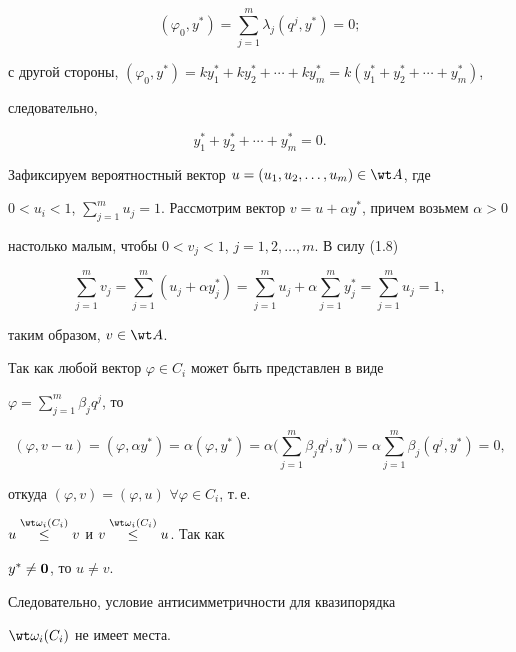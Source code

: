 $$ 


(\varphi_0,y^*)=\sum^m_{j=1}\lambda_j(q^j,y^*)=0; 


$$ 


с другой стороны, $(\varphi_0,y^*)=k y^*_1+k y^*_2+\dotsb+k 


y^*_m=k(y^*_1+y^*_2+\dotsb+y^*_m)$,


следовательно, 


\begin{equation} 


y^*_1+y^*_2+\dotsb+y^*_m=0. 


\end{equation} 


 


Зафиксируем вероятностный вектор $u=(u_1,u_2,\dotsc,u_m)\in\wt A$, где 


$0<u_i<1$, $\sum\limits^m_{j=1}u_j=1$. Рассмотрим вектор $v=u+\alpha 


y^*$, причем возьмем $\alpha>0$ 


настолько малым, чтобы $0<v_j<1$, $j=1,2,\dotsc,m$. В силу (1.8) 


$$ 


\sum^m_{j=1}v_j=\sum^m_{j=1}(u_j+\alpha y^*_j)= 


\sum^m_{j=1}u_j+\alpha\sum^m_{j=1}y^*_j=\sum^m_{j=1}u_j=1, 


$$ 


таким образом, $v\in\wt A$. 


 


Так как любой вектор $\varphi\in C_i$ может быть представлен в виде 


$\varphi=\sum\limits^m_{j=1}\beta_j q^j$, то 


$$ 


(\varphi,v-u)=(\varphi,\alpha y^*)=\alpha(\varphi,y^*)=\alpha\bigg( 


\sum^m_{j=1}\beta_j q^j,y^*\bigg)=\alpha\sum^m_{j=1} 


\beta_j(q^j,y^*)=0, 


$$ 


откуда $(\varphi,v)=(\varphi,u)$\; $\forall\varphi\in C_i$, т.\,е. 


$u\up{\wt\omega_i(C_i)}{\le}v$ и $v\up{\wt\omega_i(C_i)}{\le}u$. Так как 


$y^*\ne\bold 0$, то $u\ne v$. 


Следовательно, условие антисимметричности для квазипорядка 


$\wt\omega_i(C_i)$ не имеет места.


